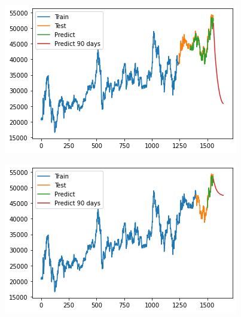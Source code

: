\documentclass[conference]{IEEEtran}
\begin{document}
\begin{minipage}{0.23\textwidth}
    \centering
    \includegraphics[width=\linewidth]{images/RNN/RNN_BIDV_90days_82.png}
    \label{fig:image1}
\end{minipage}
\hfill
\begin{minipage}{0.23\textwidth}
    \centering
    \includegraphics[width=\linewidth]{images/RNN/RNN_BIDV_90days_91.png}
    \label{fig:image2}
\end{minipage}
\end{document}
